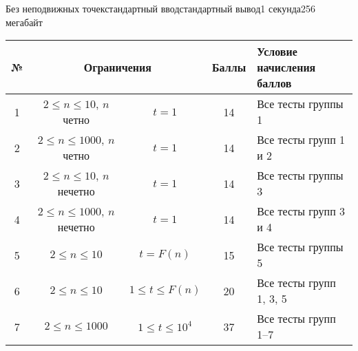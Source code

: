 \begin{problem}{Без неподвижных точек}{стандартный ввод}{стандартный вывод}{1 секунда}{256 мегабайт}
\begin{tabular}{|c|cc|c|l|}
\hline
№ & \multicolumn{2}{c|}{Ограничения}& Баллы & Условие начисления баллов\\
\hline
1 & $2 \le n \le 10$, $n$ четно& $t=1$ & 14 & Все тесты группы 1\\
\hline
2 & $2 \le n \le 1000$, $n$ четно & $t = 1$& 14& Все тесты групп 1 и 2\\
\hline
3 & $2 \le n \le 10$, $n$ нечетно& $t=1$ & 14 & Все тесты группы 3\\
\hline
4 & $2 \le n \le 1000$, $n$ нечетно & $t = 1$& 14& Все тесты групп 3 и 4\\
\hline
5 & $2 \le n \le 10$ & $t = F(n)$& 15 & Все тесты группы 5\\
\hline
6 & $2 \le n \le 10$ & $1 \le t \le F(n)$& 20 & Все тесты групп 1, 3, 5\\
\hline
7 & $2 \le n \le 1000$ & $1 \le t \le 10^4$& 37 & Все тесты групп 1--7\\
\hline
\end{tabular}

\Example

\begin{example}
%
\end{example}

\end{problem}

